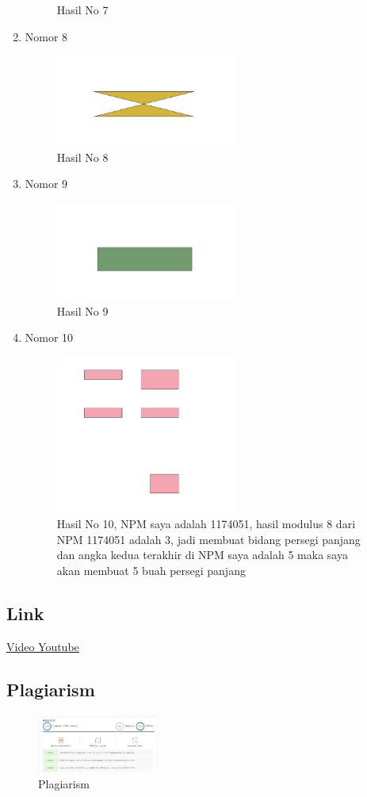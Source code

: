 \begin{enumerate}
\begin{figure}[H]
		\centering
		\caption{Hasil No 7}
	\end{figure}
	\item Nomor 8
	
	\begin{figure}[H]
        \includegraphics[width=6cm]{figures/1174051/2/8.PNG}
		\centering
		\caption{Hasil No 8}
	\end{figure}
	\item Nomor 9
	
	\begin{figure}[H]
		\includegraphics[width=6cm]{figures/1174051/2/9.PNG}
		\centering
		\caption{Hasil No 9}
	\end{figure}
	\item Nomor 10
	
	\begin{figure}[H]
        \includegraphics[width=6cm]{figures/1174051/2/10.PNG}
		\centering
		\caption{Hasil No 10, NPM saya adalah 1174051, hasil modulus 8 dari NPM 1174051 adalah 3, jadi membuat bidang persegi panjang dan angka kedua terakhir di NPM saya adalah 5 maka saya akan membuat 5 buah persegi panjang}
	\end{figure}
\end{enumerate}
\subsection{Link}
 \href{https://www.youtube.com/watch?v=RE9UUjy9_00}{Video Youtube}
\subsection{Plagiarism}
\begin{figure}[H]
	\includegraphics[width=4cm]{figures/1174051/2/plagiat.png}
	\centering
	\caption{Plagiarism}
\end{figure}